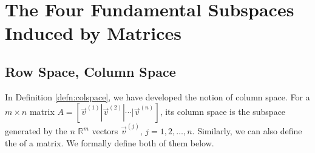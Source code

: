 
\section{The Four Fundamental Subspaces Induced by Matrices}

\subsection{Row Space, Column Space}

In Definition \ref{defn:colspace}, we have developed the notion of column space. For a $m\times n$ matrix $A = [\vec{v}^{(1)}|\vec{v}^{(2)}|\cdots|\vec{v}^{(n)}]$, its column space is the subspace generated by the $n$ $\mathbb{R}^m$ vectors $\vec{v}^{(j)}$, $j = 1,2,\ldots,n$. Similarly, we can also define the  of a matrix. We formally define both of them below.

